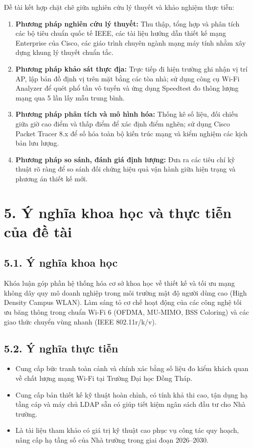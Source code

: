 Đề tài kết hợp chặt chẽ giữa nghiên cứu lý thuyết và khảo nghiệm thực tiễn:
\begin{enumerate}
    \item \textbf{Phương pháp nghiên cứu lý thuyết:} Thu thập, tổng hợp và phân tích các bộ tiêu chuẩn quốc tế IEEE, các tài liệu hướng dẫn thiết kế mạng Enterprise của Cisco, các giáo trình chuyên ngành mạng máy tính nhằm xây dựng khung lý thuyết chuẩn tắc.
    \item \textbf{Phương pháp khảo sát thực địa:} Trực tiếp đi hiện trường ghi nhận vị trí AP, lập bản đồ định vị trên mặt bằng các tòa nhà; sử dụng công cụ Wi-Fi Analyzer để quét phổ tần vô tuyến và ứng dụng Speedtest đo thông lượng mạng qua 5 lần lấy mẫu trung bình.
    \item \textbf{Phương pháp phân tích và mô hình hóa:} Thống kê số liệu, đối chiếu giữa giờ cao điểm và thấp điểm để xác định điểm nghẽn; sử dụng Cisco Packet Tracer 8.x để số hóa toàn bộ kiến trúc mạng và kiểm nghiệm các kịch bản lưu lượng.
    \item \textbf{Phương pháp so sánh, đánh giá định lượng:} Đưa ra các tiêu chí kỹ thuật rõ ràng để so sánh đối chứng hiệu quả vận hành giữa hiện trạng và phương án thiết kế mới.
\end{enumerate}

\section*{5. Ý nghĩa khoa học và thực tiễn của đề tài}

\subsection*{5.1. Ý nghĩa khoa học}
Khóa luận góp phần hệ thống hóa cơ sở khoa học về thiết kế và tối ưu mạng không dây quy mô doanh nghiệp trong môi trường mật độ người dùng cao (High Density Campus WLAN). Làm sáng tỏ cơ chế hoạt động của các công nghệ tối ưu băng thông trong chuẩn Wi-Fi 6 (OFDMA, MU-MIMO, BSS Coloring) và các giao thức chuyển vùng nhanh (IEEE 802.11r/k/v).

\subsection*{5.2. Ý nghĩa thực tiễn}
\begin{itemize}
    \item Cung cấp bức tranh toàn cảnh và chính xác bằng số liệu đo kiểm khách quan về chất lượng mạng Wi-Fi tại Trường Đại học Đồng Tháp.
    \item Cung cấp bản thiết kế kỹ thuật hoàn chỉnh, có tính khả thi cao, tận dụng hạ tầng cáp và máy chủ LDAP sẵn có giúp tiết kiệm ngân sách đầu tư cho Nhà trường.
    \item Là tài liệu tham khảo có giá trị kỹ thuật cao phục vụ công tác quy hoạch, nâng cấp hạ tầng số của Nhà trường trong giai đoạn 2026--2030.
\end{itemize}

